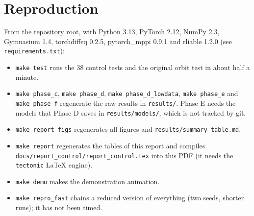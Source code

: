 \documentclass[11pt,a4paper]{article}
\begin{document}
\section{Reproduction}
From the repository root, with Python 3.13, PyTorch 2.12, NumPy 2.3, Gymnasium 1.4, torchdiffeq 0.2.5, pytorch\_mppi 0.9.1 and rliable 1.2.0 (see \texttt{requirements.txt}):
\begin{itemize}[leftmargin=1.5em]
\item \texttt{make test} runs the 38 control tests and the original orbit test in about half a minute.
\item \texttt{make phase\_c}, \texttt{make phase\_d}, \texttt{make phase\_d\_lowdata}, \texttt{make phase\_e} and \texttt{make phase\_f} regenerate the raw results in \texttt{results/}. Phase E needs the models that Phase D saves in \texttt{results/models/}, which is not tracked by git.
\item \texttt{make report\_figs} regenerates all figures and \texttt{results/summary\_table.md}.
\item \texttt{make report} regenerates the tables of this report and compiles \texttt{docs/report\_control/report\_control.tex} into this PDF (it needs the \texttt{tectonic} LaTeX engine).
\item \texttt{make demo} makes the demonstration animation.
\item \texttt{make repro\_fast} chains a reduced version of everything (two seeds, shorter runs); it has not been timed.
\end{itemize}
\end{document}
